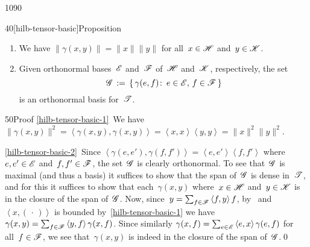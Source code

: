 \begin{parsec}{1090}
\begin{point}{40}[hilb-tensor-basic]{Proposition}
\begin{enumerate}
\item
\label{hilb-tensor-basic-1}
We have $\|\gamma(x,y)\|=\|x\|\|y\|$
for all~$x\in\mathscr{H}$ and~$y\in\mathscr{K}$.
\item
\label{hilb-tensor-basic-2}
Given orthonormal bases~$\mathscr{E}$ and~$\mathscr{F}$
of~$\mathscr{H}$ and~$\mathscr{K}$, respectively,
the set
\begin{equation*}
	\mathscr{G}\,:=\,\{\,\gamma(e,f)\colon \,e\in \mathscr{E},\,f\in\mathscr{F}\,\}
\end{equation*}
is an orthonormal basis for~$\mathscr{T}$.%
\end{enumerate}
\spacingfix%
\begin{point}{50}{Proof}%
\ref{hilb-tensor-basic-1}\ 
We have $\|\gamma(x,y)\|^2
= \left<\gamma(x,y),\gamma(x,y)\right>
=\left<x,x\right>\left<y,y\right>
= \|x\|^2\|y\|^2$.

\ref{hilb-tensor-basic-2}\ 
Since $\left<\gamma(e,e'),\gamma(f,f')\right>
=\left<e,e'\right>\left<f,f'\right>$
where~$e,e'\in \mathscr{E}$
and~$f,f'\in\mathscr{F}$,
the set~$\mathscr{G}$ is clearly orthonormal.
To see that~$\mathscr{G}$ is maximal (and thus a basis)
it suffices
to show that the span of~$\mathscr{G}$ 
is dense in~$\mathscr{T}$,
and for this it suffices
to show that each~$\gamma(x,y)$
where~$x\in\mathscr{H}$ and~$y\in\mathscr{K}$
is in the closure of the span of~$\mathscr{G}$.
Now,
since~$y=\sum_{f\in\mathscr{F}}\left<f,y\right> f$,
by~
and~$\left<x,(\,\cdot\,)\right>$
is bounded by~\ref{hilb-tensor-basic-1}
we have~$\gamma(x,y)= \sum_{f\in\mathscr{F}}
\left<y,f\right>\gamma(x,f)$.
Since similarly $\gamma(x,f)=\sum_{e\in\mathscr{E}} \left<e,x\right>\gamma(e,f)$ 
for all~$f\in\mathscr{F}$,
we see that~$\gamma(x,y)$
is indeed in the closure of the span of~$\mathscr{G}$.\qed
\end{point}
\end{point}
\end{parsec}
